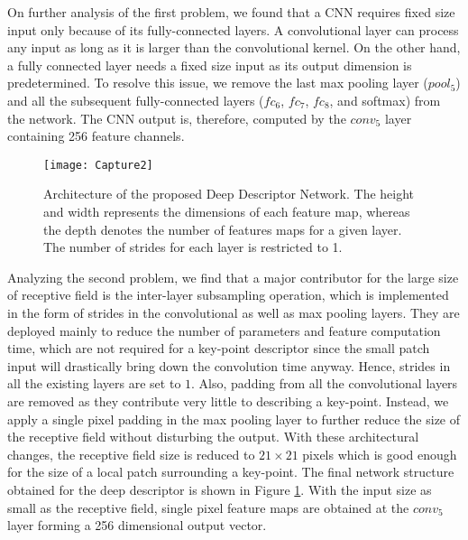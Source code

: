 \documentclass[10pt,twocolumn,letterpaper]{article}
\begin{document}
On further analysis of the first problem, we found that a CNN requires fixed size input only because of its fully-connected layers. A convolutional layer can process any input as long as it is larger than the convolutional kernel. On the other hand, a fully connected layer needs a fixed size input as its output dimension is predetermined. To resolve this issue, we remove the last max pooling layer ($pool_5$) and all the subsequent fully-connected layers ($fc_6$, $fc_7$, $fc_8$, and softmax) from the network. The CNN output is, therefore, computed by the $conv_5$ layer containing 256 feature channels.
\begin{figure*}[t!]
\begin{center}
\texttt{[image: Capture2]}
\end{center}
\caption{Architecture of the proposed Deep Descriptor Network. The height and width represents the dimensions of each feature map, whereas the depth denotes the number of features maps for a given layer. The number of strides for each layer is restricted to 1.}
\label{architecture}
\end{figure*}
Analyzing the second problem, we find that a major contributor for the large size of receptive field is the inter-layer subsampling operation, which is implemented in the form of strides in the convolutional as well as max pooling layers. They are deployed mainly to reduce the number of parameters and feature computation time, which are not required for a key-point descriptor since the small patch input will drastically bring down the convolution time anyway. Hence, strides in all the existing layers are set to $1$. Also, padding from all the convolutional layers are removed as they contribute very little to describing a key-point. Instead, we apply a single pixel padding in the max pooling layer to further reduce the size of the receptive field without disturbing the output. With these architectural changes, the receptive field size is reduced to $21 \times 21$ pixels which is good enough for the size of a local patch surrounding a key-point. The final network structure obtained for the deep descriptor is shown in Figure \ref{architecture}.  With the input size as small as the receptive field, single pixel feature maps are obtained at the $conv_5$ layer forming a 256 dimensional output vector.
\end{document}
